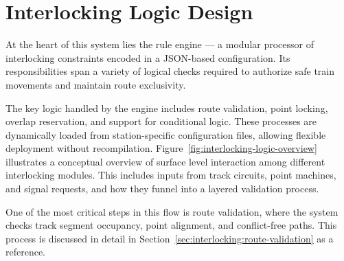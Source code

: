 \section{Interlocking Logic Design}
\label{sec:system-overview:interlocking-logic}

At the heart of this system lies the rule engine — a modular processor of interlocking constraints encoded in a JSON-based configuration. Its responsibilities span a variety of logical checks required to authorize safe train movements and maintain route exclusivity.

The key logic handled by the engine includes route validation, point locking, overlap reservation, and support for conditional logic. These processes are dynamically loaded from station-specific configuration files, allowing flexible deployment without recompilation. Figure~\ref{fig:interlocking-logic-overview} illustrates a conceptual overview of surface level interaction among different interlocking modules. This includes inputs from track circuits, point machines, and signal requests, and how they funnel into a layered validation process.



One of the most critical steps in this flow is route validation, where the system checks track segment occupancy, point alignment, and conflict-free paths. This process is discussed in detail in Section~\ref{sec:interlocking:route-validation} as a reference.
